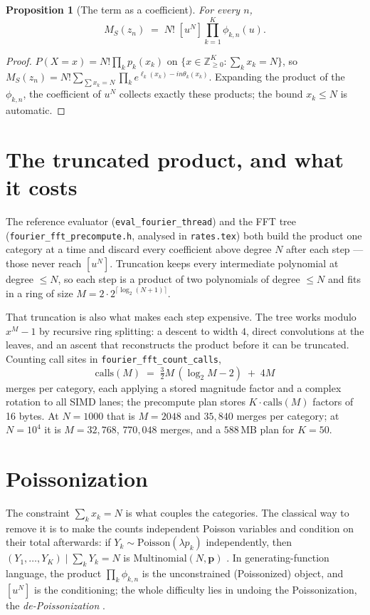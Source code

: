 \documentclass[11pt]{article}
\newtheorem{proposition}{Proposition}
\newcommand{\coef}[1]{[u^{#1}]}
\begin{document}
\begin{proposition}[The term as a coefficient]
\label{prop:coef}
For every $n$,
\[
  M_S(z_n)\;=\;N!\;\coef{N}\prod_{k=1}^{K}\phi_{k,n}(u).
\]
\end{proposition}
\begin{proof}
$P(X=x)=N!\prod_k p_k(x_k)$ on $\{x\in\mathbb Z_{\ge0}^K:\sum_kx_k=N\}$, so
$M_S(z_n)=N!\sum_{\sum x_k=N}\prod_k e^{\ell_k(x_k)-in\theta_k(x_k)}$. Expanding the product of the
$\phi_{k,n}$, the coefficient of $u^N$ collects exactly these products; the bound $x_k\le N$ is
automatic.
\end{proof}

\section{The truncated product, and what it costs}
\label{sec:tree}

The reference evaluator (\texttt{eval\_fourier\_thread}) and the FFT tree
(\texttt{fourier\_fft\_precompute.h}, analysed in \texttt{rates.tex}) both build the product one
category at a time and discard every coefficient above degree $N$ after each step --- those never
reach $\coef N$. Truncation keeps every intermediate polynomial at degree $\le N$, so each step is a
product of two polynomials of degree $\le N$ and fits in a ring of size
$M=2\cdot2^{\lceil\log_2(N+1)\rceil}$.

That truncation is also what makes each step expensive. The tree works modulo $x^M-1$ by
recursive ring splitting: a descent to width $4$, direct convolutions at the leaves, and an ascent
that reconstructs the product before it can be truncated. Counting call sites in
\texttt{fourier\_fft\_count\_calls},
\begin{equation}
  \label{eq:calls}
  \mathrm{calls}(M)\;=\;\tfrac32M\,(\log_2M-2)\;+\;4M
\end{equation}
merges per category, each applying a stored magnitude factor and a complex rotation to all SIMD
lanes; the precompute plan stores $K\cdot\mathrm{calls}(M)$ factors of 16 bytes. At $N=1000$ that is
$M=2048$ and $35{,}840$ merges per category; at $N=10^4$ it is $M=32{,}768$, $770{,}048$ merges, and
a $588$\,MB plan for $K=50$.

\section{Poissonization}
\label{sec:poisson}

The constraint $\sum_kx_k=N$ is what couples the categories. The classical way to remove it is to
make the counts independent Poisson variables and condition on their total afterwards: if
$Y_k\sim\mathrm{Poisson}(\lambda p_k)$ independently, then $(Y_1,\dots,Y_K)\mid\sum_kY_k=N$ is
$\mathrm{Multinomial}(N,\mathbf p)$ \citep{levin1981}. In generating-function language, the product
$\prod_k\phi_{k,n}$ is the unconstrained (Poissonized) object, and $\coef N$ is the conditioning; the
whole difficulty lies in undoing the Poissonization, the \emph{de-Poissonization}
\citep{jacquetszpankowski1998}.
\end{document}
